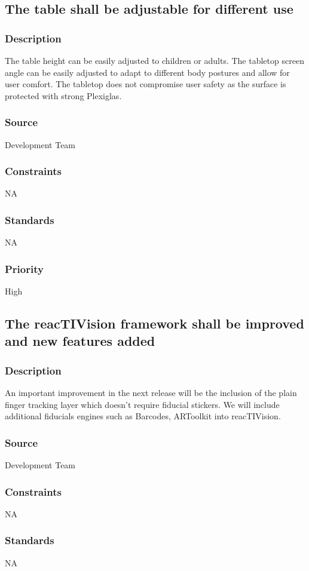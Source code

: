 \subsection{The table shall be adjustable for different use }
\subsubsection{Description}
The table height can be easily adjusted to children or adults. The tabletop screen angle can be easily adjusted to adapt to different body postures and allow for user comfort. The tabletop does not compromise user safety as the surface is protected with strong Plexiglas.
\subsubsection{Source}
Development Team
\subsubsection{Constraints}
NA
\subsubsection{Standards}
NA
\subsubsection{Priority}
High

\subsection{The reacTIVision framework shall be improved and new features added }
\subsubsection{Description}
An important improvement in the next release will be the inclusion of the plain finger tracking layer which doesn't require fiducial stickers. We will include additional fiducials engines such as Barcodes, ARToolkit into reacTIVision.
\subsubsection{Source}
Development Team
\subsubsection{Constraints}
NA
\subsubsection{Standards}
NA
